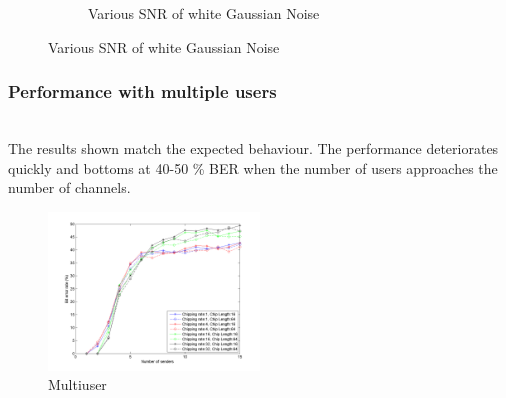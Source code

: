 \begin{figure}[H]
\begin{subfigure}[b]{0.5\textwidth}
					\caption{Various SNR of white Gaussian Noise}
					\label{fig:fhss_gaussian}
				\end{subfigure}
			\end{figure}
		
		\subsubsection{Performance with multiple users}~\\
			The results shown match the expected behaviour. The performance deteriorates quickly and bottoms at 40-50 \% BER when the number of users approaches the number of channels.
			
			\begin{figure}[H]
			\centering
				\includegraphics[width=0.5\textwidth]{imgs/results/plot_mode_fhss-test_numSenders-rep_20-dataRate_8-dataLength_128.png}
				\caption{Multiuser}
				\label{fig:fhss_multiuser}
			\end{figure}